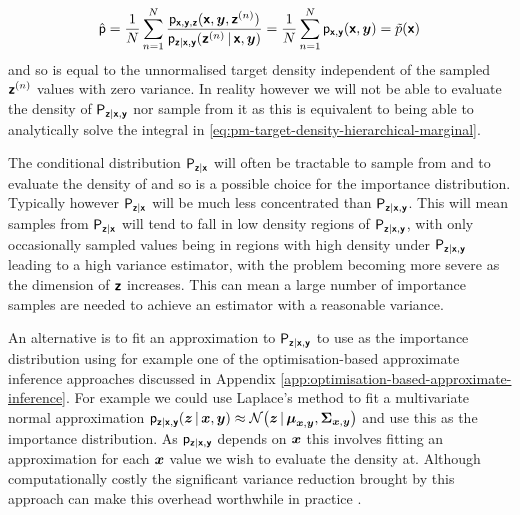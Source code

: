 \begin{equation}
  \hat{\mathsf{p}} = 
  \frac{1}{N} \sum_{n=1}^N 
  \frac
    {\mathsf{p}_{\boldsymbol{\mathsf{x}},\boldsymbol{\mathsf{y}},\boldsymbol{\mathsf{z}}}(\boldsymbol{\mathsf{x}},\boldsymbol{y},\boldsymbol{\mathsf{z}}^{(n)})}
    {\mathsf{p}_{\boldsymbol{\mathsf{z}}|\boldsymbol{\mathsf{x}},\boldsymbol{\mathsf{y}}}(\boldsymbol{\mathsf{z}}^{(n)}\operatorname{|}\boldsymbol{\mathsf{x}},\boldsymbol{y})} =
  \frac{1}{N} \sum_{n=1}^N \mathsf{p}_{\boldsymbol{\mathsf{x}},\boldsymbol{\mathsf{y}}}(\boldsymbol{\mathsf{x}},\boldsymbol{y}) = \tilde{p}(\boldsymbol{\mathsf{x}})  
\end{equation}
and so is equal to the unnormalised target density independent of the sampled $\boldsymbol{\mathsf{z}}^{(n)}$ values with zero variance. In reality however we will not be able to evaluate the density of $\mathsf{P}_{\boldsymbol{\mathsf{z}}|\boldsymbol{\mathsf{x}},\boldsymbol{\mathsf{y}}}$ nor sample from it as this is equivalent to being able to analytically solve the integral in \eqref{eq:pm-target-density-hierarchical-marginal}.

The conditional distribution $\mathsf{P}_{\boldsymbol{\mathsf{z}}|\boldsymbol{\mathsf{x}}}$ will often be tractable to sample from and to evaluate the density of and so is a possible choice for the importance distribution. Typically however $\mathsf{P}_{\boldsymbol{\mathsf{z}}|\boldsymbol{\mathsf{x}}}$ will be much less concentrated than $\mathsf{P}_{\boldsymbol{\mathsf{z}}|\boldsymbol{\mathsf{x}},\boldsymbol{\mathsf{y}}}$. This will mean samples from $\mathsf{P}_{\boldsymbol{\mathsf{z}}|\boldsymbol{\mathsf{x}}}$ will tend to fall in low density regions of $\mathsf{P}_{\boldsymbol{\mathsf{z}}|\boldsymbol{\mathsf{x}},\boldsymbol{\mathsf{y}}}$, with only occasionally sampled values being in regions with high density under $\mathsf{P}_{\boldsymbol{\mathsf{z}}|\boldsymbol{\mathsf{x}},\boldsymbol{\mathsf{y}}}$ leading to a high variance estimator, with the problem becoming more severe as the dimension of $\boldsymbol{\mathsf{z}}$ increases. This can mean a large number of importance samples are needed to achieve an estimator with a reasonable variance.

An alternative is to fit an approximation to $\mathsf{P}_{\boldsymbol{\mathsf{z}}|\boldsymbol{\mathsf{x}},\boldsymbol{\mathsf{y}}}$ to use as the importance distribution using for example one of the optimisation-based approximate inference approaches discussed in Appendix \ref{app:optimisation-based-approximate-inference}. For example we could use Laplace's method to fit a multivariate normal approximation $\pden{\rvct{z}|\rvct{x},\rvct{y}}(\vct{z}\gvn\vct{x},\vct{y}) \approx \nrm{\vct{z} \gvn \vct{\mu}_{\vct{x},\vct{y}},\mtx{\Sigma}_{\vct{x},\vct{y}}}$ and use this as the importance distribution. As $\mathsf{p}_{\boldsymbol{\mathsf{z}}|\boldsymbol{\mathsf{x}},\boldsymbol{\mathsf{y}}}$ depends on $\boldsymbol{x}$ this involves fitting an approximation for each $\boldsymbol{x}$ value we wish to evaluate the density at. Although computationally costly the significant variance reduction brought by this approach can make this overhead worthwhile in practice \citep{filippone2014pseudo}.

